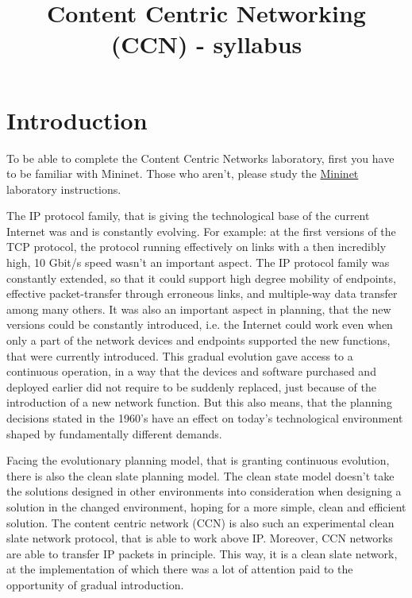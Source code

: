 \documentclass[a4paper]{article}
\title{Content Centric Networking (CCN) - syllabus}
\author{}
\date{}
\begin{document}
\maketitle

\tableofcontents

\section{Introduction}

To be able to complete the Content Centric Networks laboratory, first you have to be familiar with
Mininet. Those who aren't, please study the \href{https://qosip.tmit.bme.hu/foswiki/pub/Meres/OpenFlowMSc/OpenFlow-Mininet-syllabus-en.pdf}{Mininet} laboratory instructions.

The IP protocol family, that is giving the technological base of the current Internet was and is 
constantly evolving. For example: at the first versions of the TCP protocol, the protocol running
 effectively on links with a then incredibly high, 10 Gbit/s speed wasn't an important aspect. The 
IP protocol family was constantly extended, so that it could support high degree mobility of endpoints,
 effective packet-transfer through erroneous links, and multiple-way data transfer among many others.
It was also an important aspect in planning, that the new versions could be constantly introduced,
i.e. the Internet could work even when only a part of the network devices and endpoints supported 
the new functions, that were currently introduced. This gradual evolution gave access to a continuous 
operation, in a way that the devices and software purchased and deployed earlier did not require to be
suddenly replaced, just because of the introduction of a new network function. But this also means,
that the planning decisions stated in the 1960's have an effect on today's technological environment
shaped by fundamentally different demands.

Facing the evolutionary planning model, that is granting continuous evolution, there is also the
clean slate planning model. The clean state model doesn't take the solutions designed in other
environments into consideration when designing a solution in the changed environment, hoping for
a more simple, clean and efficient solution. The content centric network (CCN) is also such an
experimental clean slate network protocol, that is able to work above IP. Moreover, CCN networks
are able to transfer IP packets in principle. This way, it is a clean slate network, at the 
implementation of which there was a lot of attention paid to the opportunity of gradual introduction.
\end{document}
